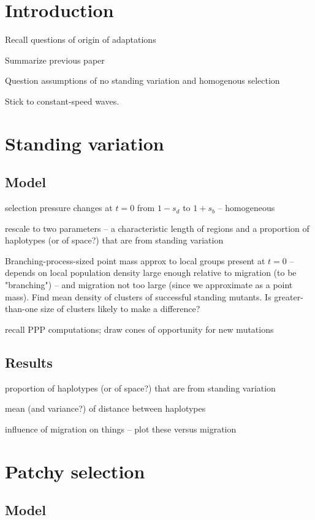 \documentclass{article}
\begin{document}
\section{Introduction}

Recall questions of origin of adaptations

Summarize previous paper

Question assumptions of no standing variation and homogenous selection

Stick to constant-speed waves.

\section{Standing variation}

\subsection{Model}

selection pressure changes at $t=0$ from $1-s_d$ to $1+s_b$ -- homogeneous

rescale to two parameters 
-- a characteristic length of regions and a proportion of haplotypes (or of space?) that are from standing variation

Branching-process-sized point mass approx to local groups present at $t=0$ 
-- depends on local population density large enough relative to migration (to be "branching")
-- and migration not too large (since we approximate as a point mass).
Find mean density of clusters of successful standing mutants.
Is greater-than-one size of clusters likely to make a difference?

recall PPP computations; draw cones of opportunity for new mutations

\subsection{Results}

proportion of haplotypes (or of space?) that are from standing variation

mean (and variance?) of distance between haplotypes

influence of migration on things -- plot these versus migration


\section{Patchy selection}

\subsection{Model}
\end{document}
